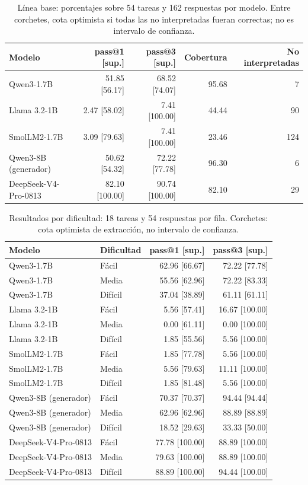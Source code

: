 \begingroup\small\setlength{\tabcolsep}{3pt}
\begin{table}[ht]
\centering
\begin{tabular}{lrrrr}
Modelo & pass@1 [sup.] & pass@3 [sup.] & Cobertura & No interpretadas \\
\midrule
Qwen3-1.7B & 51.85 [56.17] & 68.52 [74.07] & 95.68 & 7 \\
Llama 3.2-1B & 2.47 [58.02] & 7.41 [100.00] & 44.44 & 90 \\
SmolLM2-1.7B & 3.09 [79.63] & 7.41 [100.00] & 23.46 & 124 \\
Qwen3-8B (generador) & 50.62 [54.32] & 72.22 [77.78] & 96.30 & 6 \\
DeepSeek-V4-Pro-0813 & 82.10 [100.00] & 90.74 [100.00] & 82.10 & 29 \\
\end{tabular}
\caption{Línea base: porcentajes sobre 54 tareas y 162 respuestas por modelo. Entre corchetes, cota optimista si todas las no interpretadas fueran correctas; no es intervalo de confianza.}
\label{tab:baseline}
\end{table}
\begin{table}[ht]
\centering
\begin{tabular}{llrr}
Modelo & Dificultad & pass@1 [sup.] & pass@3 [sup.] \\
\midrule
Qwen3-1.7B & Fácil & 62.96 [66.67] & 72.22 [77.78] \\
Qwen3-1.7B & Media & 55.56 [62.96] & 72.22 [83.33] \\
Qwen3-1.7B & Difícil & 37.04 [38.89] & 61.11 [61.11] \\
Llama 3.2-1B & Fácil & 5.56 [57.41] & 16.67 [100.00] \\
Llama 3.2-1B & Media & 0.00 [61.11] & 0.00 [100.00] \\
Llama 3.2-1B & Difícil & 1.85 [55.56] & 5.56 [100.00] \\
SmolLM2-1.7B & Fácil & 1.85 [77.78] & 5.56 [100.00] \\
SmolLM2-1.7B & Media & 5.56 [79.63] & 11.11 [100.00] \\
SmolLM2-1.7B & Difícil & 1.85 [81.48] & 5.56 [100.00] \\
Qwen3-8B (generador) & Fácil & 70.37 [70.37] & 94.44 [94.44] \\
Qwen3-8B (generador) & Media & 62.96 [62.96] & 88.89 [88.89] \\
Qwen3-8B (generador) & Difícil & 18.52 [29.63] & 33.33 [50.00] \\
DeepSeek-V4-Pro-0813 & Fácil & 77.78 [100.00] & 88.89 [100.00] \\
DeepSeek-V4-Pro-0813 & Media & 79.63 [100.00] & 88.89 [100.00] \\
DeepSeek-V4-Pro-0813 & Difícil & 88.89 [100.00] & 94.44 [100.00] \\
\end{tabular}
\caption{Resultados por dificultad: 18 tareas y 54 respuestas por fila. Corchetes: cota optimista de extracción, no intervalo de confianza.}
\label{tab:levels}
\end{table}
\endgroup
